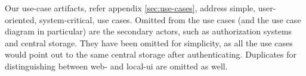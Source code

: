 Our use-case artifacts, refer appendix \ref{sec:use-cases}, address simple, user-oriented, system-critical, use cases.
Omitted from the use cases (and the use case diagram in particular) are the secondary actors, such as authorization systems and central storage.
They have been omitted for simplicity, as all the use cases would point out to the same central storage after authenticating. Duplicates for distinguishing between web- and local-ui are omitted as well.